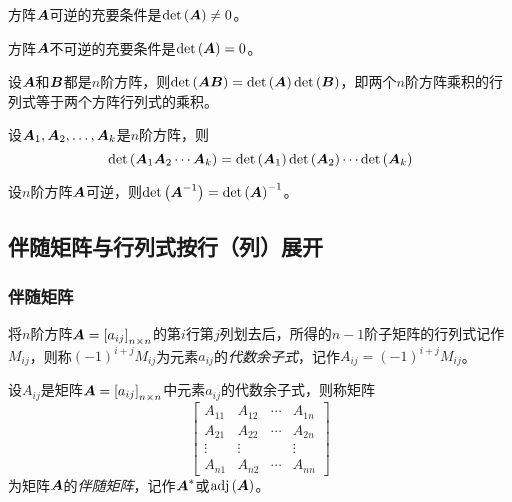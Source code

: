 \documentclass{ctexart}
\begin{document}
\begin{theorem}
    方阵\(\boldsymbol{A}\)可逆的充要条件是\(\mathrm{det}\left( \boldsymbol{A} \right)\neq0\)。
\end{theorem}

\begin{infer}
    方阵\(\boldsymbol{A}\)不可逆的充要条件是\(\mathrm{det}\left( \boldsymbol{A} \right)=0\)。
\end{infer}

\begin{property}
    设\(\boldsymbol{A}\)和\(\boldsymbol{B}\)都是\(n\)阶方阵，则\(\mathrm{det}\left( \boldsymbol{A}\boldsymbol{B} \right)=\mathrm{det}\left( \boldsymbol{A} \right)\mathrm{det}\left( \boldsymbol{B} \right)\)，即两个\(n\)阶方阵乘积的行列式等于两个方阵行列式的乘积。
\end{property}

\begin{infer}
    设\({\boldsymbol{A}}_1,{\boldsymbol{A}}_2,\dots,{\boldsymbol{A}}_{k}\)是\(n\)阶方阵，则
    \begin{equation*}
        \mathrm{det}\left( \boldsymbol{A}_1\boldsymbol{A}_2\cdots\boldsymbol{A}_k \right)=\mathrm{det}\left( \boldsymbol{A}_1 \right)\mathrm{det}\left( \boldsymbol{A}_2 \right)\cdots\mathrm{det}\left( \boldsymbol{A}_k \right)
    \end{equation*}
\end{infer}

\begin{property}
    设\(n\)阶方阵\(\boldsymbol{A}\)可逆，则\(\mathrm{det}\left( {\boldsymbol{A}}^{-1} \right)={\mathrm{det}\left( \boldsymbol{A} \right)}^{-1}\)。
\end{property}

\subsection{伴随矩阵与行列式按行（列）展开}

\subsubsection*{伴随矩阵}

\begin{definition}[代数余子式]
    将\(n\)阶方阵\(\boldsymbol{A}=\left[ a_{ij} \right]_{n\times n}\)的第\(i\)行第\(j\)列划去后，所得的\(n-1\)阶子矩阵的行列式记作\(M_{ij}\)，则称\((-1)^{i+j}M_{ij}\)为元素\(a_{ij}\)的\emph{代数余子式}，记作\(A_{ij}=(-1)^{i+j}M_{ij}\)。
\end{definition}

\begin{definition}[伴随矩阵]
    设\(A_{ij}\)是矩阵\(\boldsymbol{A}=\left[ a_{ij} \right]_{n\times n}\)中元素\(a_{ij}\)的代数余子式，则称矩阵
    \begin{equation*}
        \begin{bmatrix}
            A_{11} & A_{12} & \cdots & A_{1n} \\
            A_{21} & A_{22} & \cdots & A_{2n} \\
            \vdots & \vdots &        & \vdots \\
            A_{n1} & A_{n2} & \cdots & A_{nn}
        \end{bmatrix}
    \end{equation*}
    为矩阵\(\boldsymbol{A}\)的\emph{伴随矩阵}，记作\(\boldsymbol{A}^*\)或\(\mathrm{adj}\left( \boldsymbol{A} \right)\)。
\end{definition}
\end{document}
